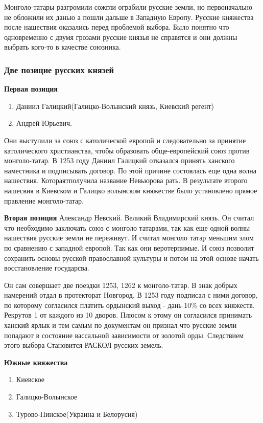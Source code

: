 \documentclass[a4paper]{article}
\begin{document}
Монголо-татары разгромили сожгли ограбили русские земли, но первоначально не обложили их данью а пошли дальше в Западную Европу. Русские княжества после нашествия оказались перед проблемой выбора. Было понятно что одновременно с двумя грозами русские князья не справятся и они должны выбрать кого-то в качестве союзника.

\subsubsection{Две позицие русских князей}


\textbf{Первая позиция}
\begin{enumerate}
    \item Даниил Галицкий(Галицко-Волынский князь, Киевский регент)
    \item Андрей Юрьевич.
\end{enumerate}
Они выступили за союз с католической европой и следовательно за принятие католического христианства, чтобы образовать обще-европейский союз против монголо-татар. В 1253 году Даниил Галицкий отказался принять ханского наместника и подписывать договор. По этой причине состоялась еще одна волна нашествия. Котораятполучила название Невьюрова рать.
В результате второго нашесвия в Киевском и Галицко волынском княжестве было установлено прямое правление монголо-татар.


\textbf{Вторая позиция}
Александр Невский. Великий Владимирский князь. Он считал что необходимо заключать союз с монголо татарами, так как еще одной волны нашествия русские земли не переживут. И считал монголо татар меньшим злом по сравнению с западной европой. Так как они веротерпимые. И союз позволит сохранить основы русской православной культуры и потом на этой основе начать восстановление государсва.

Он сам совершает две поездки 1253, 1262 к монголо-татар. В знак добрых намерений отдал в протекторат Новгород.
В 1253 году подписал с ними договор, по которому согласился платить ордынский выход - дань 10\% со всех княжеств. Рекрутов 1 от каждого из 10 дворов. Плюсом к этому он согласился принимать ханский ярлык и тем самым по документам он признал что русские земли попадают в состояние вассальной зависимости от золотой орды. Следствием этого выбора Становится РАСКОЛ русских земель.

\textbf{Южные княжества}
\begin{enumerate}
    \item Киевское
    \item Галицко-Волынское
    \item Турово-Пинское(Украина и Белорусия)
\end{enumerate}
\end{document}
